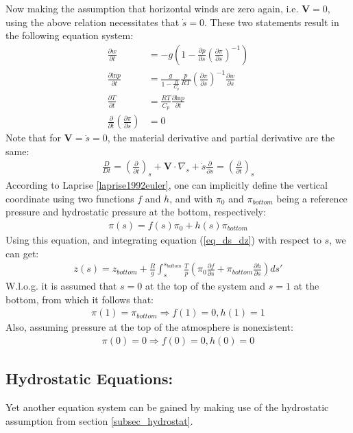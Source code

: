 Now making the assumption that horizontal winds are zero again, i.e. $\textbf{V}=0$, using the above relation necessitates that $\dot{s}=0$.
These two statements result in the following equation system:
\begin{align*}
\frac{\partial w}{\partial t} &= -g(1 - \frac{\partial p}{\partial s}(\frac{\partial \pi}{\partial s})^{-1}) \\
\frac{\partial \text{ln}p}{\partial t} &= \frac{g}{1- \frac{R}{C_p}} \frac{p}{RT}(\frac{\partial \pi}{\partial s})^{-1} \frac{\partial w}{\partial s}\\
\frac{\partial T}{\partial t} &= \frac{RT}{C_p}\frac{\partial \text{ln}p}{\partial t}\\
\frac{\partial}{\partial t}(\frac{\partial \pi}{\partial s}) &= 0
\end{align*}
Note that for $\textbf{V}=\dot{s}=0$, the material derivative and partial derivative are the same:
\begin{align*}
\frac{D}{Dt} = (\frac{\partial}{\partial t})_s + \textbf{V} \cdot \nabla _s + \dot{s}\frac{\partial }{\partial s} = (\frac{\partial}{\partial t})_s
\end{align*}
According to Laprise \ref{laprise1992euler}, one can implicitly define the vertical coordinate using two functions $f$ and $h$, and with $\pi_0$ and $\pi _{bottom}$ being a reference pressure and hydrostatic pressure at the bottom, respectively:
\begin{align*}
\pi (s) = f(s)\pi_0 + h(s)\pi_{bottom}
\end{align*}
Using this equation, and integrating equation (\ref{eq_ds_dz}) with respect to $s$, we can get:
\begin{align*}
z(s) = z_{bottom} + \frac{R}{g}\int _s ^{s_{bottom}} \frac{T}{p}(\pi_0 \frac{\partial f}{\partial s} + \pi_{bottom} \frac{\partial h}{\partial s})ds'
\end{align*}
W.l.o.g. it is assumed that $s=0$ at the top of the system and $s=1$ at the bottom, from which it follows that:
\begin{align*}
\pi(1) = \pi_{bottom} \Rightarrow f(1) = 0 , h(1) = 1
\end{align*}
Also, assuming pressure at the top of the atmosphere is nonexistent:
\begin{align*}
\pi(0) = 0 \Rightarrow f(0) = 0, h(0) = 0
\end{align*}

\subsection{Hydrostatic Equations:}
Yet another equation system can be gained by making use of the hydrostatic assumption from section \ref{subsec_hydrostat}.

